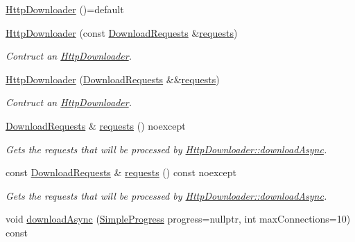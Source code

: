 \begin{DoxyCompactItemize}
\item 
\hyperlink{classdg_1_1deepcore_1_1network_1_1_http_downloader_ad3562074929d133e54c31df007dec36f}{Http\+Downloader} ()=default
\item 
\hyperlink{group___network_module_gaee68926e47a7a8e18926b25a274a6741}{Http\+Downloader} (const \hyperlink{group___network_module_ga6a460317d5e2b04bbaa2bb5389ca2ce3}{Download\+Requests} \&\hyperlink{group___network_module_ga93ed91ce22dd499848d0f42e683d64d5}{requests})
\begin{DoxyCompactList}\small\item\em Contruct an \hyperlink{classdg_1_1deepcore_1_1network_1_1_http_downloader}{Http\+Downloader}. \end{DoxyCompactList}\item 
\hyperlink{group___network_module_gaf623ef672fad2678ff7a1f1dd8361d95}{Http\+Downloader} (\hyperlink{group___network_module_ga6a460317d5e2b04bbaa2bb5389ca2ce3}{Download\+Requests} \&\&\hyperlink{group___network_module_ga93ed91ce22dd499848d0f42e683d64d5}{requests})
\begin{DoxyCompactList}\small\item\em Contruct an \hyperlink{classdg_1_1deepcore_1_1network_1_1_http_downloader}{Http\+Downloader}. \end{DoxyCompactList}\item 
\hyperlink{group___network_module_ga6a460317d5e2b04bbaa2bb5389ca2ce3}{Download\+Requests} \& \hyperlink{group___network_module_ga93ed91ce22dd499848d0f42e683d64d5}{requests} () noexcept
\begin{DoxyCompactList}\small\item\em Gets the requests that will be processed by \hyperlink{group___network_module_ga5a3dc48bb7c2c0e14ce394c515742b47}{Http\+Downloader\+::download\+Async}. \end{DoxyCompactList}\item 
const \hyperlink{group___network_module_ga6a460317d5e2b04bbaa2bb5389ca2ce3}{Download\+Requests} \& \hyperlink{group___network_module_ga3c0af4cc2f8ea2880e48173183fdb758}{requests} () const noexcept
\begin{DoxyCompactList}\small\item\em Gets the requests that will be processed by \hyperlink{group___network_module_ga5a3dc48bb7c2c0e14ce394c515742b47}{Http\+Downloader\+::download\+Async}. \end{DoxyCompactList}\item 
void \hyperlink{group___network_module_ga5a3dc48bb7c2c0e14ce394c515742b47}{download\+Async} (\hyperlink{group___utility_module_ga6763018df79e4bdbcd8cd14cea5342b2}{Simple\+Progress} progress=nullptr, int max\+Connections=10) const 

\end{DoxyCompactItemize}
